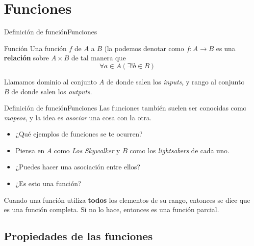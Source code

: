 \documentclass[spanish, c]{beamer}
\begin{document}
\section{Funciones}

\begin{frame}{Definición de función}{Funciones}

    \begin{block}{Función}
        Una \alert{función} $f$  de $A$ a $B$ (la podemos denotar como $f : A \to B$ es una \textbf{relación} sobre $A \times B$ de tal manera que
        $$\forall a \in A(\exists! b \in B)$$    
    \end{block} \pause
    
    \bigskip

    Llamamos \alert{dominio} al conjunto $A$ de donde salen los \textit{inputs}, y \alert{rango} al conjunto $B$ de donde salen los \textit{outputs}.

\end{frame}

\begin{frame}{Definición de función}{Funciones}
    Las funciones también suelen ser conocidas como \textit{mapeos}, y la idea es \textit{asociar} una cosa con la otra. \pause

    \bigskip
    \begin{itemize}
        \item ¿Qué ejemplos de funciones se te ocurren? \pause
        \item Piensa en $A$ como \textit{Los Skywalker} y $B$ como los \textit{lightsabers} de cada uno. \pause
        \item ¿Puedes hacer una asociación entre ellos? \pause
        \item ¿Es esto una función?
    \end{itemize} \pause

    \bigskip

    Cuando una función utiliza \textbf{todos} los elementos de su rango, entonces se dice que es una \alert{función completa}. Si no lo hace, entonces es una \alert{función parcial}.

\end{frame}

\subsection{Propiedades de las funciones}
\end{document}
